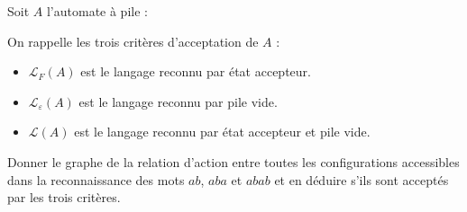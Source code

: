 
\begingroup

\begin{exercice}\label{exo:languages/pushdown/definitions}

  Soit $A$ l'automate à pile : 

  On rappelle les trois critères d'acceptation de $A$ : 
  \begin{itemize}
  \item $\mathcal{L}_F(A)$ est le langage reconnu par état accepteur.
  \item $\mathcal{L}_\varepsilon(A)$ est le langage reconnu par pile vide.
  \item $\mathcal{L}(A)$ est le langage reconnu par état accepteur et pile vide.
  \end{itemize}

  \begin{questions}
  \item   Donner le graphe de la relation d'action entre toutes les configurations accessibles
    dans la reconnaissance des mots $ab$, $aba$ et $abab$ et en déduire s'ils sont acceptés
    par les trois critères.
  \end{questions}


\end{exercice}
